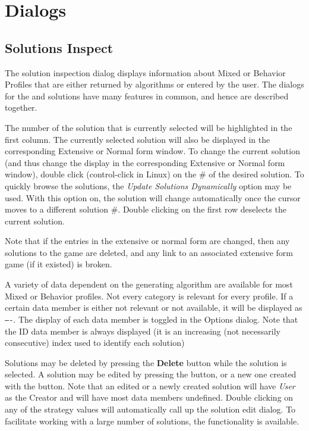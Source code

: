 \documentclass[12pt]{report}
\begin{document}
\section{Dialogs}\label{GUIDialogs}

\subsection{Solutions Inspect}\label{SolutionInspect}

The solution inspection dialog displays information about Mixed or
Behavior Profiles that are either returned by algorithms or entered by 
the user.  The dialogs for the  and  solutions have many features in common,
and hence are described together.

The number of the solution that is currently selected will be
highlighted in the first column.  The currently selected solution will
also be displayed in the corresponding Extensive or Normal form
window.  To change the current solution (and thus change the display
in the corresponding Extensive or Normal form window), double click
(control-click in Linux) on the \# of the desired solution.  To
quickly browse the solutions, the {\em Update Solutions Dynamically} 
option may be used.  With this option on, the solution will change
automatically once the cursor moves to a different solution \#.
Double clicking on the first row deselects the current solution.

Note that if the entries in the extensive or normal form are changed,
then any solutions to the game are deleted, and any link to an
associated extensive form game (if it existed) is broken.

A variety of data dependent on the generating algorithm are available
for most Mixed or Behavior profiles. Not every category is relevant
for every profile.  If a certain data member is either not relevant or
not available, it will be displayed as {\tt ----}.  The display of
each data member is toggled in the Options dialog.  Note that the ID
data member is always displayed (it is an increasing (not necessarily
consecutive) index used to identify each solution)

Solutions may be deleted by pressing the {\bf Delete} button while the
solution is selected.  A solution may be edited by pressing the 
 button, or a new one created with the 
 button.  Note that an edited or a newly
created solution will have {\em User} as the Creator and will have
most data members undefined.  Double clicking on any of the strategy
values will automatically call up the solution edit dialog.  To
facilitate working with a large number of solutions, the 
 functionality is available.
\end{document}
